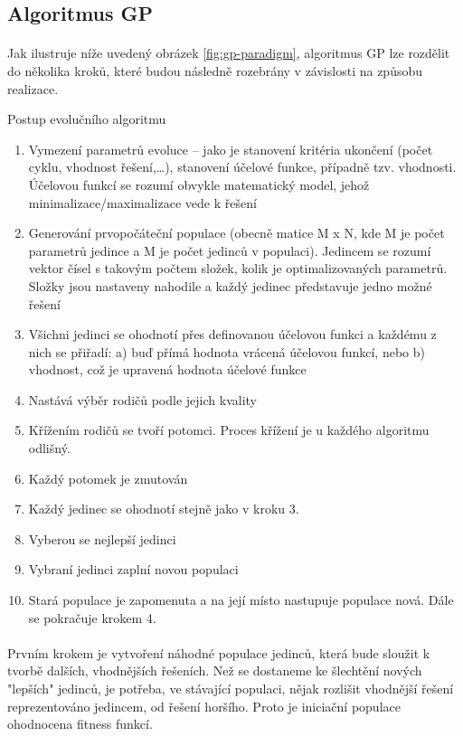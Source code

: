 \documentclass[bc,male,java,dept460]{diploma}		%
\begin{document}
\subsection{Algoritmus GP}
\paragraph*{}
Jak ilustruje níže uvedený obrázek \ref{fig:gp-paradigm}, algoritmus GP lze rozdělit do několika kroků, které budou následně rozebrány v závislosti na způsobu realizace.

\begin{example}
\label{priklad}
Postup evolučního algoritmu
\begin{enumerate}
\item Vymezení parametrů evoluce – jako je stanovení kritéria ukončení (počet cyklu, vhodnost řešení,…), stanovení účelové funkce, případně tzv. vhodnosti. Účelovou funkcí se rozumí obvykle matematický model, jehož minimalizace/maximalizace vede k řešení
\item Generování prvopočáteční populace (obecně matice M x N, kde M je počet parametrů jedince a M je počet jedinců v populaci). Jedincem se rozumí vektor čísel s takovým počtem složek, kolik je optimalizovaných parametrů. Složky jsou nastaveny nahodile a každý jedinec představuje jedno možné řešení
\item Všichni jedinci se ohodnotí přes definovanou účelovou funkci a každému z nich se přiřadí: a) buď přímá hodnota vrácená účelovou funkcí, nebo b) vhodnost, což je upravená hodnota účelové funkce
\item Nastává výběr rodičů podle jejich kvality
\item Křížením rodičů se tvoří potomci. Proces křížení je u každého algoritmu odlišný.
\item Každý potomek je zmutován
\item Každý jedinec se ohodnotí stejně jako v kroku 3.
\item Vyberou se nejlepší jedinci
\item Vybraní jedinci zaplní novou populaci
\item Stará populace je zapomenuta a na její místo nastupuje populace nová. Dále se pokračuje krokem 4.
\end{enumerate}
\end{example}

\paragraph*{}
Prvním krokem je vytvoření náhodné populace jedinců, která bude sloužit k tvorbě dalších, vhodnějších řešeních.
Než se dostaneme ke šlechtění nových "lepších" jedinců, je potřeba, ve stávající populaci, nějak rozlišit vhodnější řešení reprezentováno jedincem, od řešení horšího. Proto je iniciační populace ohodnocena fitness funkcí.
\end{document}
